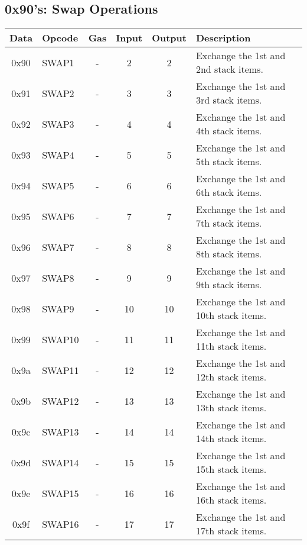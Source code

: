 \documentclass[10pt,letterpaper,leqno,bibliography=totoc]{scrartcl}
\newenvironment{alphafootnotes}
{\par\edef\savedfootnotenumber{\number\value{footnote}}
\renewcommand{\thefootnote}{\alph{footnote}}
\setcounter{footnote}{0}}
{\par\setcounter{footnote}{\savedfootnotenumber}}
\begin{document}
\begin{alphafootnotes}
		\subsection{0x90's: Swap Operations}
			\begin{longtable}{|cP{2.8cm}cccp{6cm}|}
		        \hline  
		        \textbf{Data} & \textbf{Opcode} & \textbf{Gas}  & \textbf{Input}  & \textbf{Output} & \textbf{Description} \\
		        \hline  
			0x90 & SWAP1 & - & 2 & 2 & Exchange the 1st and 2nd stack items. \\
			0x91 & SWAP2 & - & 3 & 3 & Exchange the 1st and 3rd stack items. \\
			0x92 & SWAP3 & - & 4 & 4 & Exchange the 1st and 4th stack items. \\
			0x93 & SWAP4 & - & 5 & 5 & Exchange the 1st and 5th stack items. \\
			0x94 & SWAP5 & - & 6 & 6 & Exchange the 1st and 6th stack items. \\
			0x95 & SWAP6 & - & 7 & 7 & Exchange the 1st and 7th stack items. \\
			0x96 & SWAP7 & - & 8 & 8 & Exchange the 1st and 8th stack items. \\
			0x97 & SWAP8 & - & 9 & 9 & Exchange the 1st and 9th stack items. \\
			0x98 & SWAP9 & - & 10 & 10 & Exchange the 1st and 10th stack items. \\
			0x99 & SWAP10 & - & 11 & 11 & Exchange the 1st and 11th stack items. \\
			0x9a & SWAP11 & - & 12 & 12 & Exchange the 1st and 12th stack items. \\
			0x9b & SWAP12 & - & 13 & 13 & Exchange the 1st and 13th stack items. \\
			0x9c & SWAP13 & - & 14 & 14 & Exchange the 1st and 14th stack items. \\
			0x9d & SWAP14 & - & 15 & 15 & Exchange the 1st and 15th stack items. \\
			0x9e & SWAP15 & - & 16 & 16 & Exchange the 1st and 16th stack items. \\
			0x9f & SWAP16 & - & 17 & 17 & Exchange the 1st and 17th stack items. \\	
			\hline
			\end{longtable}


\end{alphafootnotes}
\end{document}
